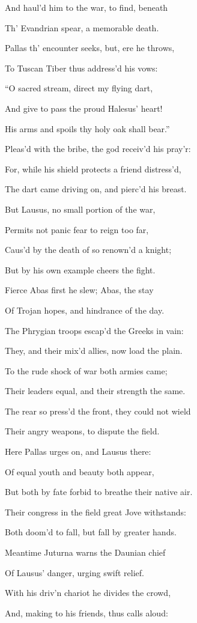 And haul’d him to the war, to find, beneath

Th’ Evandrian spear, a memorable death.

Pallas th’ encounter seeks, but, ere he throws,

To Tuscan Tiber thus address’d his vows:

“O sacred stream, direct my flying dart,

And give to pass the proud Halesus’ heart!

His arms and spoils thy holy oak shall bear.”

Pleas’d with the bribe, the god receiv’d his pray’r:

For, while his shield protects a friend distress’d,

The dart came driving on, and pierc’d his breast.

But Lausus, no small portion of the war,

Permits not panic fear to reign too far,

Caus’d by the death of so renown’d a knight;

But by his own example cheers the fight.

Fierce Abas first he slew; Abas, the stay

Of Trojan hopes, and hindrance of the day.

The Phrygian troops escap’d the Greeks in vain:

They, and their mix’d allies, now load the plain.

To the rude shock of war both armies came;

Their leaders equal, and their strength the same.

The rear so press’d the front, they could not wield

Their angry weapons, to dispute the field.

Here Pallas urges on, and Lausus there:

Of equal youth and beauty both appear,

But both by fate forbid to breathe their native air.

Their congress in the field great Jove withstands:

Both doom’d to fall, but fall by greater hands.

Meantime Juturna warns the Daunian chief

Of Lausus’ danger, urging swift relief.

With his driv’n chariot he divides the crowd,

And, making to his friends, thus calls aloud:

